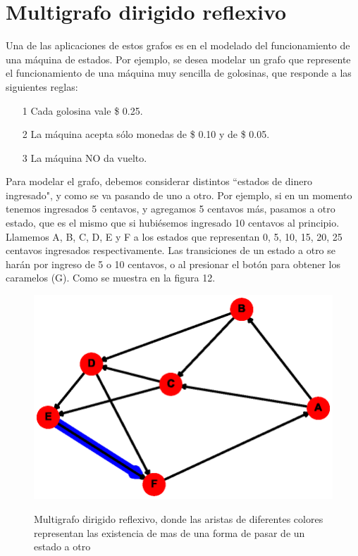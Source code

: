 \documentclass{article}
\begin{document}
\section{Multigrafo dirigido reflexivo}
Una de las aplicaciones de estos grafos es en el modelado del funcionamiento de una máquina de estados. 
Por ejemplo, se desea modelar un grafo que represente el funcionamiento de una máquina muy sencilla de golosinas, que responde a las siguientes reglas:
\begin{itemize}
\item[1] Cada golosina vale \$ 0.25.
\item[2] La máquina acepta sólo monedas de  \$ 0.10 y de \$ 0.05.
\item[3] La máquina NO da vuelto.
\end{itemize}
Para modelar el grafo, debemos considerar distintos ``estados de dinero ingresado", y como se va pasando de uno a otro. Por ejemplo, si en un momento tenemos ingresados 5 centavos, y agregamos 5 centavos más, pasamos a otro estado, que es el mismo que si hubiésemos ingresado 10 centavos al principio. Llamemos A, B, C, D, E y F a los estados que representan 0, 5, 10, 15, 20, 25 centavos ingresados respectivamente. Las transiciones de un estado a otro se harán por ingreso de 5 o 10 centavos, o al presionar el botón para obtener los caramelos (G). Como se muestra en la figura 12. 
\begin{center}

\end{center}
\begin{figure}[h]
\begin{center}
\includegraphics[scale=0.7]{Graf12.eps}\\
\caption{Multigrafo dirigido reflexivo, donde las aristas de diferentes colores representan las existencia de mas de una forma de pasar de un estado a otro}
\end{center}
\end{figure}
\newpage


\end{document}
